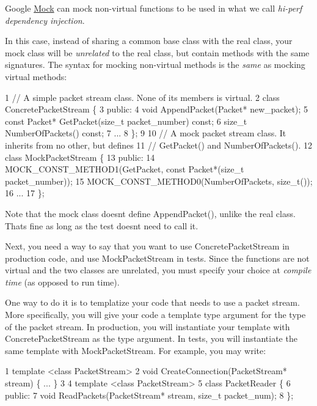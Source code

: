 Google \hyperlink{class_mock}{Mock} can mock non-\/virtual functions to be used in what we call {\itshape hi-\/perf dependency injection}.

In this case, instead of sharing a common base class with the real class, your mock class will be {\itshape unrelated} to the real class, but contain methods with the same signatures. The syntax for mocking non-\/virtual methods is the {\itshape same} as mocking virtual methods\+:


\begin{DoxyCode}
1 // A simple packet stream class.  None of its members is virtual.
2 class ConcretePacketStream \{
3  public:
4   void AppendPacket(Packet* new\_packet);
5   const Packet* GetPacket(size\_t packet\_number) const;
6   size\_t NumberOfPackets() const;
7   ...
8 \};
9 
10 // A mock packet stream class.  It inherits from no other, but defines
11 // GetPacket() and NumberOfPackets().
12 class MockPacketStream \{
13  public:
14   MOCK\_CONST\_METHOD1(GetPacket, const Packet*(size\_t packet\_number));
15   MOCK\_CONST\_METHOD0(NumberOfPackets, size\_t());
16   ...
17 \};
\end{DoxyCode}


Note that the mock class doesn\textquotesingle{}t define {\ttfamily Append\+Packet()}, unlike the real class. That\textquotesingle{}s fine as long as the test doesn\textquotesingle{}t need to call it.

Next, you need a way to say that you want to use {\ttfamily Concrete\+Packet\+Stream} in production code, and use {\ttfamily Mock\+Packet\+Stream} in tests. Since the functions are not virtual and the two classes are unrelated, you must specify your choice at {\itshape compile time} (as opposed to run time).

One way to do it is to templatize your code that needs to use a packet stream. More specifically, you will give your code a template type argument for the type of the packet stream. In production, you will instantiate your template with {\ttfamily Concrete\+Packet\+Stream} as the type argument. In tests, you will instantiate the same template with {\ttfamily Mock\+Packet\+Stream}. For example, you may write\+:


\begin{DoxyCode}
1 template <class PacketStream>
2 void CreateConnection(PacketStream* stream) \{ ... \}
3 
4 template <class PacketStream>
5 class PacketReader \{
6  public:
7   void ReadPackets(PacketStream* stream, size\_t packet\_num);
8 \};
\end{DoxyCode}


